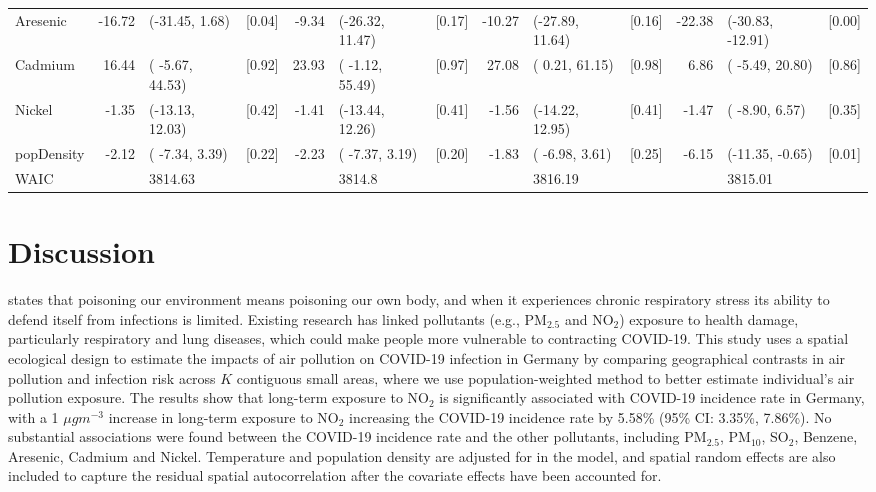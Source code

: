 \documentclass[12,]{article}
\begin{document}
\begin{landscape}
\begin{table}
\begin{tabular}[t]{lrlcrlcrlcrlc}
Aresenic & -16.72 & (-31.45,   1.68) & [0.04] & -9.34 & (-26.32,  11.47) & [0.17] & -10.27 & (-27.89,  11.64) & [0.16] & -22.38 & (-30.83, -12.91) & [0.00]\\
Cadmium & 16.44 & ( -5.67,  44.53) & [0.92] & 23.93 & ( -1.12,  55.49) & [0.97] & 27.08 & (  0.21,  61.15) & [0.98] & 6.86 & ( -5.49,  20.80) & [0.86]\\
Nickel & -1.35 & (-13.13,  12.03) & [0.42] & -1.41 & (-13.44,  12.26) & [0.41] & -1.56 & (-14.22,  12.95) & [0.41] & -1.47 & ( -8.90,   6.57) & [0.35]\\
popDensity & -2.12 & ( -7.34,   3.39) & [0.22] & -2.23 & ( -7.37,   3.19) & [0.20] & -1.83 & ( -6.98,   3.61) & [0.25] & -6.15 & (-11.35,  -0.65) & [0.01]\\
WAIC &  & 3814.63 &  &  & 3814.8 &  &  & 3816.19 &  &  & 3815.01 & \\
\bottomrule
\end{tabular}
\end{table}
\end{landscape}
\restoregeometry

\hypertarget{sec:conclusion}{%
\section{Discussion}\label{sec:conclusion}}

\textcite{Ogen2020} states that poisoning our environment means
poisoning our own body, and when it experiences chronic respiratory
stress its ability to defend itself from infections is limited. Existing
research has linked pollutants (e.g., PM\(_{2.5}\) and NO\(_2\))
exposure to health damage, particularly respiratory and lung diseases,
which could make people more vulnerable to contracting COVID-19. This
study uses a spatial ecological design to estimate the impacts of air
pollution on COVID-19 infection in Germany by comparing geographical
contrasts in air pollution and infection risk across \(K\) contiguous
small areas, where we use population-weighted method to better estimate
individual's air pollution exposure. The results show that long-term
exposure to NO\(_2\) is significantly associated with COVID-19 incidence
rate in Germany, with a 1 \(\mu gm^{-3}\) increase in long-term exposure
to NO\(_2\) increasing the COVID-19 incidence rate by 5.58\% (95\% CI:
3.35\%, 7.86\%). No substantial associations were found between the
COVID-19 incidence rate and the other pollutants, including
PM\(_{2.5}\), PM\(_{10}\), SO\(_2\), Benzene, Aresenic, Cadmium and
Nickel. Temperature and population density are adjusted for in the
model, and spatial random effects are also included to capture the
residual spatial autocorrelation after the covariate effects have been
accounted for.
\end{document}
